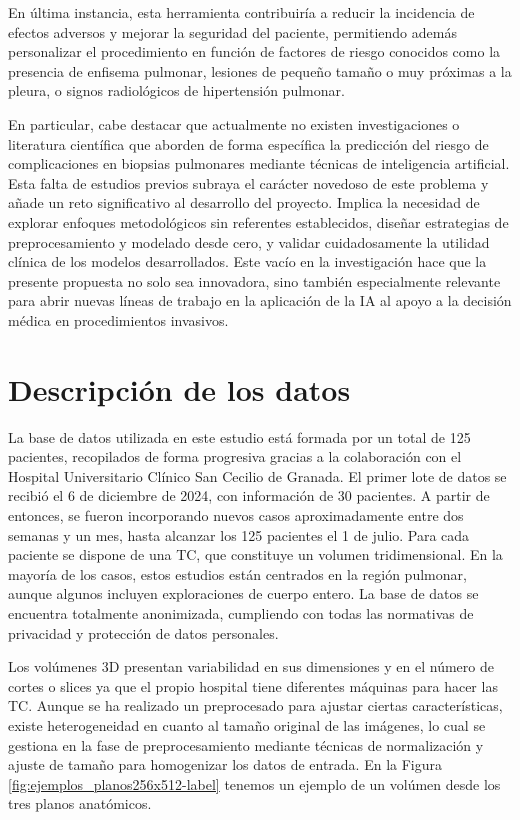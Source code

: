 En última instancia, esta herramienta contribuiría a reducir la incidencia de efectos adversos y mejorar la seguridad del paciente, permitiendo además personalizar el procedimiento en función de factores de riesgo conocidos como la presencia de enfisema pulmonar, lesiones de pequeño tamaño o muy próximas a la pleura, o signos radiológicos de hipertensión pulmonar.

En particular, cabe destacar que actualmente no existen investigaciones o literatura científica que aborden de forma específica la predicción del riesgo de complicaciones en biopsias pulmonares mediante técnicas de inteligencia artificial. Esta falta de estudios previos subraya el carácter novedoso de este problema y añade un reto significativo al desarrollo del proyecto. Implica la necesidad de explorar enfoques metodológicos sin referentes establecidos, diseñar estrategias de preprocesamiento y modelado desde cero, y validar cuidadosamente la utilidad clínica de los modelos desarrollados. Este vacío en la investigación hace que la presente propuesta no solo sea innovadora, sino también especialmente relevante para abrir nuevas líneas de trabajo en la aplicación de la IA al apoyo a la decisión médica en procedimientos invasivos.



\section{Descripción de los datos}
La base de datos utilizada en este estudio está formada por un total de 125 pacientes, recopilados de forma progresiva gracias a la colaboración con el Hospital Universitario Clínico San Cecilio de Granada. El primer lote de datos se recibió el 6 de diciembre de 2024, con información de 30 pacientes. A partir de entonces, se fueron incorporando nuevos casos aproximadamente entre dos semanas y un mes, hasta alcanzar los 125 pacientes el 1 de julio. Para cada paciente se dispone de una TC, que constituye un volumen tridimensional. En la mayoría de los casos, estos estudios están centrados en la región pulmonar, aunque algunos incluyen exploraciones de cuerpo entero.
La base de datos se encuentra totalmente anonimizada, cumpliendo con todas las normativas de privacidad y protección de datos personales. 

Los volúmenes 3D presentan variabilidad en sus dimensiones y en el número de cortes o slices ya que el propio hospital tiene diferentes máquinas para hacer las TC. Aunque se ha realizado un preprocesado para ajustar ciertas características, existe heterogeneidad en cuanto al tamaño original de las imágenes, lo cual se gestiona en la fase de preprocesamiento mediante técnicas de normalización y ajuste de tamaño para homogenizar los datos de entrada. En la Figura \ref{fig:ejemplos_planos256x512-label} tenemos un ejemplo de un volúmen desde los tres planos anatómicos. 

